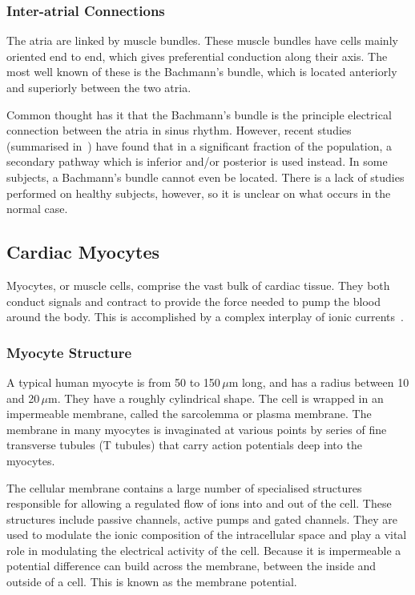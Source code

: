 \subsubsection{Inter-atrial Connections}

The atria are linked by muscle bundles.
These muscle bundles have cells mainly oriented end to end, which gives
preferential conduction along their axis.
The most well known of these is the Bachmann's bundle, which is located
anteriorly and superiorly between the two atria.

Common thought has it that the Bachmann's bundle is the principle electrical
connection between the atria in sinus rhythm.
However, recent studies (summarised in~\cite{Platonov2007,Platonov2008a}) have
found that in a significant fraction of the population, a secondary pathway
which is inferior and/or posterior is used instead.
In some subjects, a Bachmann's bundle cannot even be located.
There is a lack of studies performed on healthy subjects, however, so it is
unclear on what occurs in the normal case.

\subsection{Cardiac Myocytes}

Myocytes, or muscle cells, comprise the vast bulk of cardiac tissue.
They both conduct signals and contract to provide the force needed to pump the
blood around the body.
This is accomplished by a complex interplay of ionic
currents~\cite{Katz2006}.

\subsubsection{Myocyte Structure}

A typical human myocyte is from 50 to 150$\,\mu$m long, and has a radius
between 10 and 20$\,\mu$m.
They have a roughly cylindrical shape.
The cell is wrapped in an impermeable membrane, called the sarcolemma or plasma
membrane.
The membrane in many myocytes is invaginated at various points by series of
fine transverse tubules (T tubules) that carry action potentials deep into the
myocytes.

The cellular membrane contains a large number of specialised structures
responsible for allowing a regulated flow of ions into and out of the cell.
These structures include passive channels, active pumps and gated channels.
They are used to modulate the ionic composition of the intracellular
space and play a vital role in modulating the electrical activity of the cell.
Because it is impermeable a potential difference can build across the membrane,
between the inside and outside of a cell.
This is known as the membrane potential.

